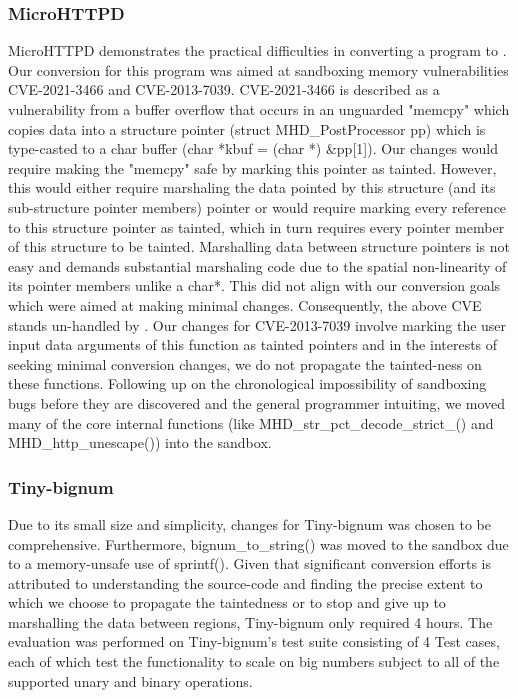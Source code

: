 \subsubsection{MicroHTTPD}
MicroHTTPD demonstrates the practical difficulties in converting a program to \systemname. Our conversion for this program was aimed at sandboxing memory vulnerabilities CVE-2021-3466 and CVE-2013-7039. CVE-2021-3466 is described as a vulnerability from a buffer overflow that occurs in an unguarded "memcpy" which copies data into a structure pointer (struct MHD\_PostProcessor pp) which is type-casted to a char buffer (char *kbuf = (char *) \&pp[1]). Our changes would require making the "memcpy" safe by marking this pointer as tainted. However, this would either require marshaling the data pointed by this structure (and its sub-structure pointer members) pointer or would require marking every reference to this structure pointer as tainted, which in turn requires every pointer member of this structure to be tainted. Marshalling data between structure pointers is not easy and demands substantial marshaling code due to the spatial non-linearity of its pointer members unlike a char*. This did not align with our conversion goals which were aimed at making minimal changes. Consequently, the above CVE stands un-handled by \systemname.  Our changes for CVE-2013-7039 involve marking the user input data arguments of this function as tainted pointers and in the interests of seeking minimal conversion changes, we do not propagate the tainted-ness on these functions. Following up on the chronological impossibility of sandboxing bugs before they are discovered and the general programmer intuiting, we moved many of the core internal functions (like MHD\_str\_pct\_decode\_strict\_() and MHD\_http\_unescape()) into the sandbox. 

\subsubsection{Tiny-bignum}
Due to its small size and simplicity, \systemname changes for Tiny-bignum was chosen to be comprehensive. Furthermore, bignum\_to\_string() was moved to the sandbox due to a memory-unsafe use of sprintf(). Given that significant \systemname conversion efforts is attributed to understanding the source-code and finding the precise extent to which we choose to propagate the taintedness or to stop and give up to marshalling the data between regions, Tiny-bignum only required 4 hours. The evaluation was performed on Tiny-bignum's test suite consisting of 4 Test cases, each of which test the functionality to scale on big numbers subject to all of the supported unary and binary operations.  